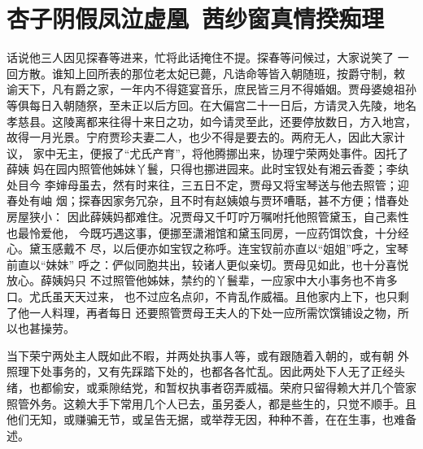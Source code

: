 \chapter{杏子阴假凤泣虚凰~茜纱窗真情揆痴理}

话说他三人因见探春等进来，忙将此话掩住不提。探春等问候过，大家说笑了
一回方散。谁知上回所表的那位老太妃已薨，凡诰命等皆入朝随班，按爵守制，敕
谕天下，凡有爵之家，一年内不得筵宴音乐，庶民皆三月不得婚姻。贾母婆媳祖孙
等俱每日入朝随祭，至未正以后方回。在大偏宫二十一日后，方请灵入先陵，地名
孝慈县。这陵离都来往得十来日之功，如今请灵至此，还要停放数日，方入地宫，
故得一月光景。宁府贾珍夫妻二人，也少不得是要去的。两府无人，因此大家计议，
家中无主，便报了“尤氏产育”，将他腾挪出来，协理宁荣两处事件。因托了薛姨
妈在园内照管他姊妹丫鬟，只得也挪进园来。此时宝钗处有湘云香菱；李纨处目今
李婶母虽去，然有时来往，三五日不定，贾母又将宝琴送与他去照管；迎春处有岫
烟；探春因家务冗杂，且不时有赵姨娘与贾环嘈聒，甚不方便；惜春处房屋狭小：
因此薛姨妈都难住。况贾母又千叮咛万嘱咐托他照管黛玉，自己素性也最怜爱他，
今既巧遇这事，便挪至潇湘馆和黛玉同房，一应药饵饮食，十分经心。黛玉感戴不
尽，以后便亦如宝钗之称呼。连宝钗前亦直以“姐姐”呼之，宝琴前直以“妹妹”
呼之：俨似同胞共出，较诸人更似亲切。贾母见如此，也十分喜悦放心。薛姨妈只
不过照管他姊妹，禁约的丫鬟辈，一应家中大小事务也不肯多口。尤氏虽天天过来，
也不过应名点卯，不肯乱作威福。且他家内上下，也只剩了他一人料理，再者每日
还要照管贾母王夫人的下处一应所需饮馔铺设之物，所以也甚操劳。

当下荣宁两处主人既如此不暇，并两处执事人等，或有跟随着入朝的，或有朝
外照理下处事务的，又有先踩踏下处的，也都各各忙乱。因此两处下人无了正经头
绪，也都偷安，或乘隙结党，和暂权执事者窃弄威福。荣府只留得赖大并几个管家
照管外务。这赖大手下常用几个人已去，虽另委人，都是些生的，只觉不顺手。且
他们无知，或赚骗无节，或呈告无据，或举荐无因，种种不善，在在生事，也难备
述。

